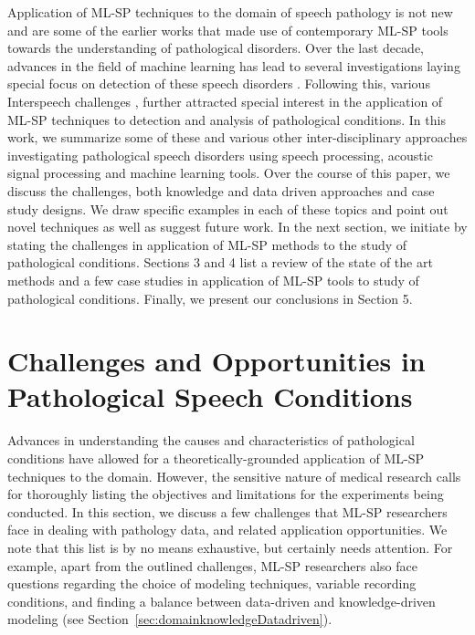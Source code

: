 \documentclass{article}
\begin{document}
Application of ML-SP techniques to the domain of speech pathology is not new and \cite{rees1973auditory,davis1979acoustic} are some of the earlier works that made use of contemporary ML-SP tools towards the understanding of pathological disorders. 
Over the last decade, advances in the field of machine learning has lead to several investigations laying special focus on detection of these speech disorders \cite{fonseca2007wavelet,chee2009mfcc}. Following this, various Interspeech challenges \cite{schuller2012interspeech,kim2013pathology}, further attracted special interest in the application of ML-SP techniques to detection and analysis of pathological conditions.  
In this work, we summarize some of these and various other inter-disciplinary approaches investigating pathological speech disorders using speech processing, acoustic signal processing and machine learning tools.
Over the course of this paper, we discuss the challenges, both knowledge and data driven approaches and case study designs. 
We draw specific examples in each of these topics and point out novel techniques as well as suggest future work.
In the next section, we initiate by stating the challenges in application of ML-SP methods to the study of pathological conditions.
Sections 3 and 4 list a review of the state of the art methods and a few case studies in application of ML-SP tools to study of pathological conditions.
Finally, we present our conclusions in Section 5. 

\section{Challenges and Opportunities in Pathological Speech Conditions}
Advances in understanding the causes and characteristics of pathological conditions have allowed for a theoretically-grounded application of ML-SP techniques to the domain.
However, the sensitive nature of medical research calls for thoroughly listing the objectives and limitations for the experiments being conducted.
In this section, we discuss a few challenges that ML-SP researchers face in dealing with pathology data, and related application opportunities. We note that this list is by no means exhaustive, but certainly needs attention. For example, apart from the outlined challenges, ML-SP researchers also face questions regarding the choice of modeling techniques, variable recording conditions, and finding a balance between data-driven and knowledge-driven modeling (see Section~\ref{sec:domainknowledgeDatadriven}).
\end{document}
